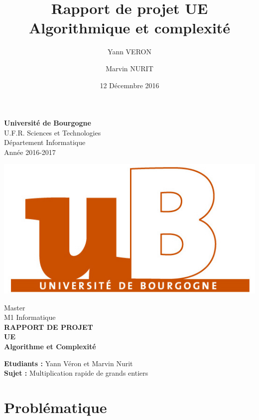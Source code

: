 \documentclass[a4paper]{report}
\title{Rapport de projet UE Algorithmique et complexité}
\author{Yann VERON}
\author{Marvin NURIT}
\date{12 Décemnbre 2016}
\begin{document}
\thispagestyle{empty}
 
\begin{minipage}{0.5\linewidth} %
\textbf{Université de Bourgogne}\\ 
U.F.R. Sciences et Technologies\\
Département Informatique\\
Année 2016-2017
\end{minipage}
\begin{minipage}{0.5\linewidth}
\begin{flushright}
\includegraphics{ub.jpg}
\end{flushright}

\end{minipage}
 
 
\vspace{5cm}
 
 
\begin{center}
\LARGE Master \\
\LARGE M1 Informatique\\
\huge \textbf{RAPPORT DE PROJET}\\
\huge \textbf{UE\\ Algorithme et Complexité}\\
\end{center}
 
 
\vspace{7cm}
 
 
\noindent %
\textbf{Etudiants  :} Yann Véron et Marvin Nurit \\
\textbf{Sujet :} Multiplication rapide de grands entiers \\

\tableofcontents
\chapter{Problématique}
\end{document}

